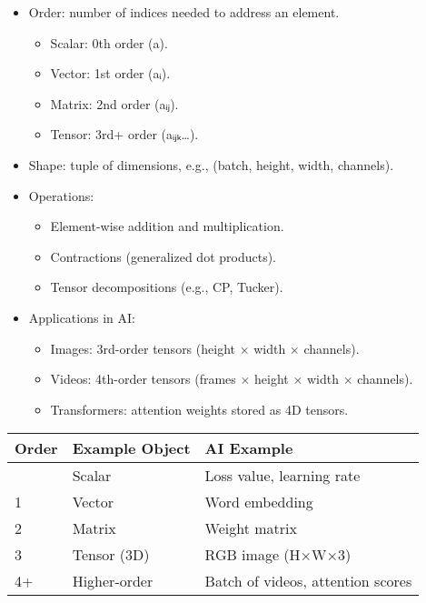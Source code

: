 \documentclass[
  letterpaper,
  DIV=11,
  numbers=noendperiod]{scrreprt}
\providecommand{\tightlist}{%
  \setlength{\itemsep}{0pt}\setlength{\parskip}{0pt}}
\begin{document}
\begin{itemize}
\item
  Order: number of indices needed to address an element.

  \begin{itemize}
  \tightlist
  \item
    Scalar: 0th order (a).
  \item
    Vector: 1st order (aᵢ).
  \item
    Matrix: 2nd order (aᵢⱼ).
  \item
    Tensor: 3rd+ order (aᵢⱼₖ\ldots).
  \end{itemize}
\item
  Shape: tuple of dimensions, e.g., (batch, height, width, channels).
\item
  Operations:

  \begin{itemize}
  \tightlist
  \item
    Element-wise addition and multiplication.
  \item
    Contractions (generalized dot products).
  \item
    Tensor decompositions (e.g., CP, Tucker).
  \end{itemize}
\item
  Applications in AI:

  \begin{itemize}
  \tightlist
  \item
    Images: 3rd-order tensors (height × width × channels).
  \item
    Videos: 4th-order tensors (frames × height × width × channels).
  \item
    Transformers: attention weights stored as 4D tensors.
  \end{itemize}
\end{itemize}

\begin{longtable}[]{@{}lll@{}}
\toprule\noalign{}
Order & Example Object & AI Example \\
\midrule\noalign{}
\endhead
\bottomrule\noalign{}
\endlastfoot
0 & Scalar & Loss value, learning rate \\
1 & Vector & Word embedding \\
2 & Matrix & Weight matrix \\
3 & Tensor (3D) & RGB image (H×W×3) \\
4+ & Higher-order & Batch of videos, attention scores \\
\end{longtable}
\end{document}

